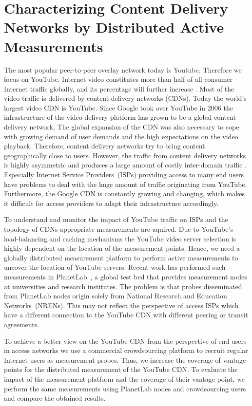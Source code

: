 \section{Characterizing Content Delivery Networks by Distributed Active Measurements}\label{sec:aslevel:crowd}

The most popular peer-to-peer overlay network today is Youtube.
Therefore we focus on YouTube.
Internet video constitutes more than half of all consumer Internet traffic globally, and its percentage will further increase \cite{ciscovni2013}. Most of the video traffic is delivered by content delivery networks (CDNs). Today the world's largest video CDN is YouTube. Since Google took over YouTube in 2006 the infrastructure of the video delivery platform has grown to be a global content delivery network.
The global expansion of the CDN was also necessary to cope with growing demand of user demands and the high expectations on the video playback. Therefore, content delivery networks try to bring content geographically close to users.
However, the traffic from content delivery networks is highly asymmetric and produces a large amount of costly inter-domain traffic \cite{labovitz2010internet}. Especially Internet Service Providers~(ISPs) providing access to many end users have problems to deal with the huge amount of traffic originating from YouTube. Furthermore, the Google CDN is constantly growing and changing, which makes it difficult for access providers to adapt their infrastructure accordingly.

To understand and monitor the impact of YouTube traffic on ISPs and the topology of CDNs appropriate measurements are aquired. Due to YouTube's load-balancing and caching mechanisms the YouTube video server selection is highly dependent on the location of the measurement points. Hence, we need a globally distributed measurement platform to perform active measurements to uncover the location of YouTube servers. Recent work \cite{adhikari2012vivisecting,adhikari2011you} has performed such measurements in PlanetLab~\cite{planetlab}, a global test bed that provides measurement nodes at universities and research institutes.
The problem is that probes disseminated from PlanetLab nodes origin solely from National Research and Education Networks~(NRENs). This may not reflect the perspective of access ISPs which have a different connection to the YouTube CDN with different peering or transit agreements.

To achieve a better view on the YouTube CDN from the perspective of end users in access networks we use a commercial crowdsourcing platform to recruit regular Internet users as measurement probes.
Thus, we increase the coverage of vantage points for the distributed measurement of the YouTube CDN.
To evaluate the impact of the measurement platform and the coverage of their vantage point,  we perform the same measurements using PlanetLab nodes and crowdsourcing users and compare the obtained results.

